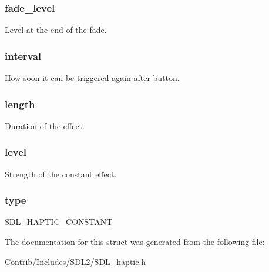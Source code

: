 \subsubsection[{\texorpdfstring{fade\+\_\+level}{fade_level}}]{ fade\+\_\+level}\hypertarget{struct_s_d_l___haptic_constant_a03b48c5ffd631a0f35741e1aa7f482dd}{}\label{struct_s_d_l___haptic_constant_a03b48c5ffd631a0f35741e1aa7f482dd}
Level at the end of the fade. 
\subsubsection[{\texorpdfstring{interval}{interval}}]{ interval}\hypertarget{struct_s_d_l___haptic_constant_a263a60513b1bdb1e91b28bd2e128e9d4}{}\label{struct_s_d_l___haptic_constant_a263a60513b1bdb1e91b28bd2e128e9d4}
How soon it can be triggered again after button. 
\subsubsection[{\texorpdfstring{length}{length}}]{ length}\hypertarget{struct_s_d_l___haptic_constant_afbde362d49894774c8b9c9e85ac0a913}{}\label{struct_s_d_l___haptic_constant_afbde362d49894774c8b9c9e85ac0a913}
Duration of the effect. 
\subsubsection[{\texorpdfstring{level}{level}}]{ level}\hypertarget{struct_s_d_l___haptic_constant_adf1b5bc92984a2dbc520fb3469f40393}{}\label{struct_s_d_l___haptic_constant_adf1b5bc92984a2dbc520fb3469f40393}
Strength of the constant effect. 
\subsubsection[{\texorpdfstring{type}{type}}]{ type}\hypertarget{struct_s_d_l___haptic_constant_a8db4a3e9f29940892f2773bca31c74e1}{}\label{struct_s_d_l___haptic_constant_a8db4a3e9f29940892f2773bca31c74e1}
\hyperlink{_s_d_l__haptic_8h_a955fb9f680dcf9cc72a3d5263e85b80a}{S\+D\+L\+\_\+\+H\+A\+P\+T\+I\+C\+\_\+\+C\+O\+N\+S\+T\+A\+NT} 

The documentation for this struct was generated from the following file\+:\begin{DoxyCompactItemize}
\item 
Contrib/\+Includes/\+S\+D\+L2/\hyperlink{_s_d_l__haptic_8h}{S\+D\+L\+\_\+haptic.\+h}\end{DoxyCompactItemize}
